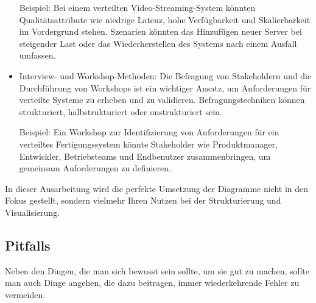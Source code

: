 \begin{itemize}
Beispiel: Bei einem verteilten Video-Streaming-System könnten Qualitätsattribute wie niedrige Latenz, hohe Verfügbarkeit und Skalierbarkeit im Vordergrund stehen. Szenarien könnten das Hinzufügen neuer Server bei steigender Last oder das Wiederherstellen des Systems nach einem Ausfall umfassen.

\item Interview- und Workshop-Methoden: Die Befragung von Stakeholdern und die Durchführung von Workshops ist ein wichtiger Ansatz, um Anforderungen für verteilte Systeme zu erheben und zu validieren. Befragungstechniken können strukturiert, halbstrukturiert oder unstrukturiert sein.

Beispiel: Ein Workshop zur Identifizierung von Anforderungen für ein verteiltes Fertigungssystem könnte Stakeholder wie Produktmanager, Entwickler, Betriebsteams und Endbenutzer zusammenbringen, um gemeinsam Anforderungen zu definieren.
\end{itemize}   

In dieser Ausarbeitung wird die perfekte Umsetzung der Diagramme nicht in den Fokus gestellt, sondern vielmehr Ihren Nutzen bei der Strukturierung und Visualisierung.

\subsection{Pitfalls}

Neben den Dingen, die man sich bewusst sein sollte, um sie gut zu machen, sollte man auch Dinge angehen, die dazu beitragen, immer wiederkehrende Fehler zu vermeiden. 

